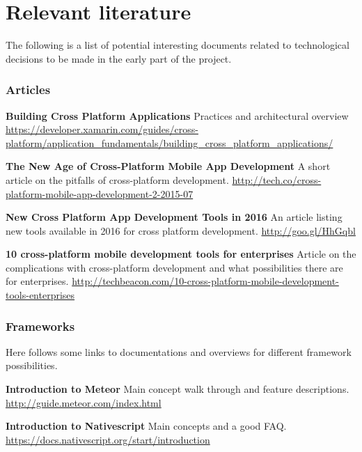 \chapter{Relevant literature}
The following is a list of potential interesting documents related to technological decisions to be made in the early part of the project.

\subsection*{Articles}

\textbf{Building Cross Platform Applications} \newline
Practices and architectural overview \newline
\url{https://developer.xamarin.com/guides/cross-platform/application_fundamentals/building_cross_platform_applications/}

\textbf{The New Age of Cross-Platform Mobile App Development} \newline
A short article on the pitfalls of cross-platform development. \newline
\url{http://tech.co/cross-platform-mobile-app-development-2-2015-07}

\textbf{New Cross Platform App Development Tools in 2016} \newline
An article listing new tools available in 2016 for cross platform development. \newline
\url{http://goo.gl/HhGqbl}

\textbf{10 cross-platform mobile development tools for enterprises} \newline
Article on the complications with cross-platform development and what possibilities there are for enterprises. \newline
\url{http://techbeacon.com/10-cross-platform-mobile-development-tools-enterprises}

\subsection*{Frameworks}
Here follows some links to documentations and overviews for different framework possibilities.

\textbf{Introduction to Meteor} \newline
Main concept walk through and feature descriptions. \newline
\url{http://guide.meteor.com/index.html}

\textbf{Introduction to Nativescript} \newline
Main concepts and a good FAQ. \newline
\url{https://docs.nativescript.org/start/introduction}

